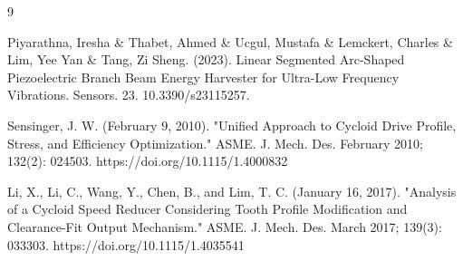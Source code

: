 \documentclass[confidential]{../../../classes/nervtech-engdoc}
\begin{document}
\begin{thebibliography}{9}

  Piyarathna, Iresha \& Thabet, Ahmed \& Ucgul, Mustafa \& Lemckert, Charles \& Lim, Yee Yan \& Tang, Zi Sheng. (2023). Linear Segmented Arc-Shaped Piezoelectric Branch Beam Energy Harvester for Ultra-Low Frequency Vibrations. Sensors. 23. 10.3390/s23115257.

  Sensinger, J. W. (February 9, 2010). "Unified Approach to Cycloid Drive Profile, Stress, and Efficiency Optimization." ASME. J. Mech. Des. February 2010; 132(2): 024503. https://doi.org/10.1115/1.4000832

  Li, X., Li, C., Wang, Y., Chen, B., and Lim, T. C. (January 16, 2017). "Analysis of a Cycloid Speed Reducer Considering Tooth Profile Modification and Clearance-Fit Output Mechanism." ASME. J. Mech. Des. March 2017; 139(3): 033303. https://doi.org/10.1115/1.4035541

\end{thebibliography}
\end{document}
